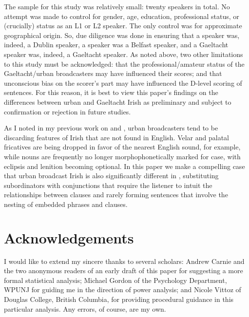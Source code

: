 \documentclass[output=paper,colorlinks,citecolor=brown]{langscibook}
\begin{document}
The sample for this study was relatively small: twenty speakers in total. No attempt was made to control for gender, age, education, professional status, or (crucially) status as an L1 or L2 speaker. The only control was for approximate geographical origin. So, due diligence was done in ensuring that a  speaker was, indeed, a Dublin speaker, a  speaker was a Belfast speaker, and a Gaeltacht speaker was, indeed, a Gaeltacht speaker. As noted above, two other limitations to this study must be acknowledged: that the professional/amateur status of the Gaeltacht/urban broadcasters may have influenced their  scores; and that unconscious bias on the scorer's part may have influenced the D-level scoring of sentences. For this reason, it is best to view this paper's findings on the differences between urban and Gaeltacht Irish as preliminary and subject to confirmation or rejection in future studies.

As I noted in my previous work on  and , urban broadcasters tend to be discarding features of Irish that are not found in English. Velar and palatal fricatives are being dropped in favor of the nearest English sound, for example, while nouns are frequently no longer morphophonetically marked for case, with eclipsis and lenition becoming optional. In this paper we make a compelling case that urban broadcast Irish is also significantly different in , substituting subordinators with conjunctions that require the listener to intuit the relationships between clauses and rarely forming sentences that involve the nesting of embedded phrases and clauses.


\section*{Acknowledgements}
I would like to extend my sincere thanks to several scholars: Andrew Carnie and the two anonymous readers of an early draft of this paper for suggesting a more formal statistical analysis; Michael Gordon of the Psychology Department, WPUNJ for guiding me in the direction of power analysis; and Nicole Vittoz of Douglas College, British Columbia, for providing procedural guidance in this particular analysis. Any errors, of course, are my own.



\sloppy
\printbibliography[heading=subbibliography,notkeyword=this]
\end{document}
